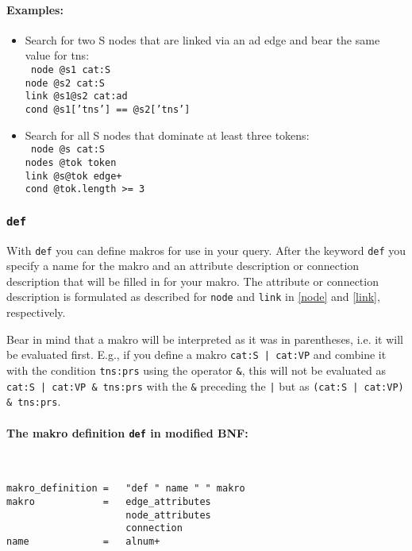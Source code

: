 \documentclass[12pt]{scrartcl}
\begin{document}
\paragraph*{Examples:}
\begin{itemize}
	\item Search for two S nodes that are linked via an ad edge and bear the same value for tns:\\
	{\tt
	node @s1 cat:S\\[-.4ex]
	node @s2 cat:S\\[-.4ex]
	link @s1@s2 cat:ad\\[-.4ex]
	cond @s1['tns'] == @s2['tns']
	}
	\item Search for all S nodes that dominate at least three tokens:\\
	{\tt
	node @s cat:S\\[-.4ex]
	nodes @tok token\\[-.4ex]
	link @s@tok edge+\\[-.4ex]
	cond @tok.length >= 3
	}
\end{itemize}


\subsubsection{\texttt{def}}\label{def}

With \texttt{def} you can define makros for use in your query.
After the keyword \texttt{def} you specify a name for the makro and an attribute description or connection description that will be filled in for your makro.
The attribute or connection description is formulated as described for \texttt{node} and \texttt{link} in \ref{node} and \ref{link}, respectively.

Bear in mind that a makro will be interpreted as it was in parentheses, i.e. it will be evaluated first.
E.g., if you define a makro \texttt{cat:S | cat:VP} and combine it with the condition \texttt{tns:prs} using the operator \texttt{\&}, this will not be evaluated as \texttt{cat:S | cat:VP \& tns:prs} with the \texttt{\&} preceding the \texttt{|} but as \texttt{(cat:S | cat:VP) \& tns:prs}.

\paragraph*{The makro definition \texttt{def} in modified BNF:}
~
\begin{framed}
\begin{lstlisting}
makro_definition =   "def " name " " makro
makro            =   edge_attributes
                     node_attributes
                     connection
name             =   alnum+
\end{lstlisting}
\end{framed}
\end{document}
